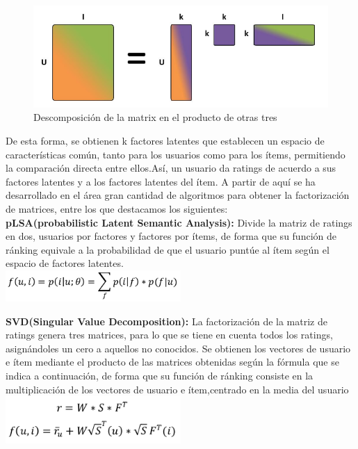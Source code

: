 \begin{figure}[h!]
	\centering
	\includegraphics[width=12cm]{./images/matrix_fact}
	\caption{Descomposición de la matrix en el producto de otras tres}
	\label{fig: matrix factorization}
\end{figure}
\newpage
De esta forma, se obtienen k factores latentes que establecen un espacio de características común, tanto para los usuarios como para los ítems, permitiendo la comparación directa entre ellos.Así, un usuario da ratings de acuerdo a sus factores latentes y a los factores latentes del ítem.
A partir de aquí se ha desarrollado en el área gran cantidad de algoritmos para obtener la factorización de matrices, entre los que destacamos los siguientes:\\

\textbf{pLSA(probabilistic Latent Semantic Analysis):} Divide la matriz de ratings en dos, usuarios por factores y factores por ítems, de forma que su función de ránking equivale a la probabilidad de que el usuario puntúe al ítem según el espacio de factores latentes.\cite{12}\\
\includegraphics[width=0.5\textwidth]{images/plsa}

\textbf{SVD(Singular Value Decomposition):} La factorización de la matriz de ratings genera tres matrices, para lo que se tiene en cuenta todos los ratings, asignándoles un cero a aquellos no conocidos. Se obtienen los vectores de usuario e ítem mediante el producto de las matrices obtenidas según la fórmula que se indica a continuación, de forma que su función de ránking consiste en la multiplicación de los vectores de usuario e ítem,centrado en la media del usuario\cite{12}\\
\includegraphics[width=0.5\textwidth]{images/svd}

